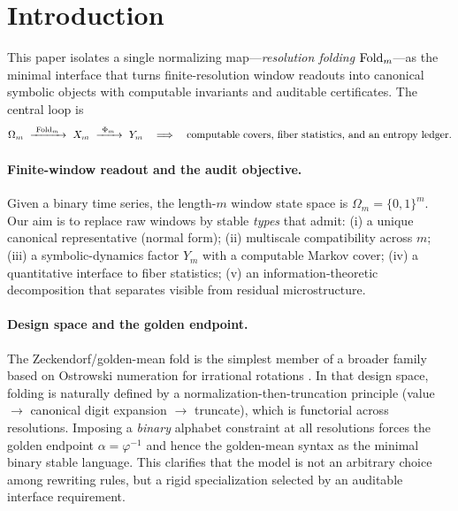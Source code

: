 \section{Introduction}\label{sec:introduction}

This paper isolates a single normalizing map---\emph{resolution folding} $\mathrm{Fold}_m$---as the minimal interface that turns finite-resolution window readouts into canonical symbolic objects with computable invariants and auditable certificates.
The central loop is
\[
\Omega_m\ \xrightarrow{\ \Fold_m\ }\ X_m\ \xrightarrow{\ \Phi_m\ }\ Y_m
\quad\Longrightarrow\quad
\text{computable covers, fiber statistics, and an entropy ledger}.
\]

\paragraph{Finite-window readout and the audit objective.}
Given a binary time series, the length-$m$ window state space is $\Omega_m=\{0,1\}^m$.
Our aim is to replace raw windows by stable \emph{types} that admit:
(i) a unique canonical representative (normal form);
(ii) multiscale compatibility across $m$;
(iii) a symbolic-dynamics factor $Y_m$ with a computable Markov cover;
(iv) a quantitative interface to fiber statistics;
(v) an information-theoretic decomposition that separates visible from residual microstructure.

\paragraph{Design space and the golden endpoint.}
The Zeckendorf/golden-mean fold is the simplest member of a broader family based on Ostrowski numeration for irrational rotations \cite{Ostrowski1922,Berthe2001Ostrowski,HieronymiTerry2018OstrowskiAddition}.
In that design space, folding is naturally defined by a normalization-then-truncation principle (value $\to$ canonical digit expansion $\to$ truncate), which is functorial across resolutions.
Imposing a \emph{binary} alphabet constraint at all resolutions forces the golden endpoint $\alpha=\varphi^{-1}$ and hence the golden-mean syntax as the minimal binary stable language.
This clarifies that the model is not an arbitrary choice among rewriting rules, but a rigid specialization selected by an auditable interface requirement.

